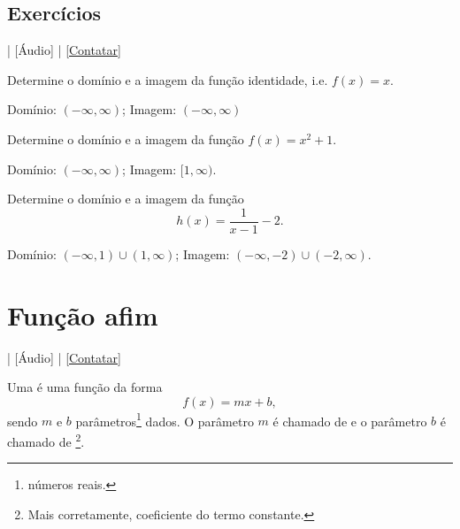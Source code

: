 \subsection*{Exercícios}

\begin{flushright}
  [Vídeo] | [Áudio] | \href{https://phkonzen.github.io/notas/contato.html}{[Contatar]}
\end{flushright}

\begin{ex}
  Determine o domínio e a imagem da função identidade, i.e. $f(x) = x$.
\end{ex}
\begin{resp}
  Domínio: $(-\infty, \infty)$; Imagem: $(-\infty, \infty)$
\end{resp}

\begin{ex}
  Determine o domínio e a imagem da função $f(x) = x^2 + 1$.
\end{ex}
\begin{resp}
  Domínio: $(-\infty, \infty)$; Imagem: $[1, \infty)$.
\end{resp}

\begin{ex}
  Determine o domínio e a imagem da função
  \begin{equation}
    h(x) = \frac{1}{x-1} - 2.
  \end{equation}
\end{ex}
\begin{resp}
  Domínio: $(-\infty, 1)\cup (1, \infty)$; Imagem: $(-\infty, -2)\cup (-2, \infty)$.
\end{resp}

\section{Função afim}\label{cap_funcao_sec_funafim}

\begin{flushright}
  [Vídeo] | [Áudio] | \href{https://phkonzen.github.io/notas/contato.html}{[Contatar]}
\end{flushright}

Uma  é uma função da forma
\begin{equation}
f(x) = mx + b,
\end{equation}
sendo $m$ e $b$ parâmetros\footnote{números reais.} dados. O parâmetro $m$ é chamado de  e o parâmetro $b$ é chamado de \footnote{Mais corretamente, coeficiente do termo constante.}.

